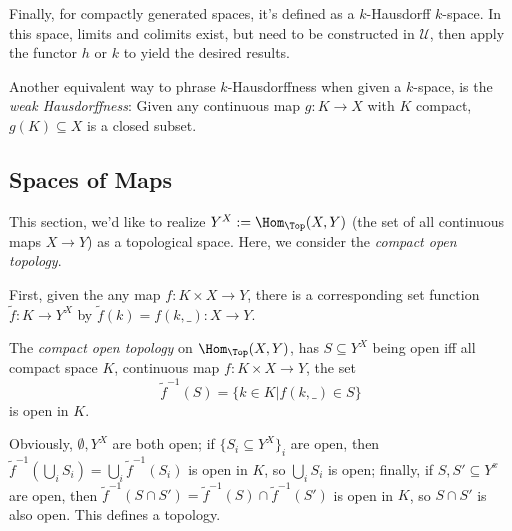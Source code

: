 \documentclass{article}
\begin{document}
Finally, for compactly generated spaces, it's defined as a $k$-Hausdorff $k$-space. In this space, limits and colimits exist, but need to be constructed in $\mathcal{U}$, then apply the functor $h$ or $k$ to yield the desired results.

Another equivalent way to phrase $k$-Hausdorffness when given a $k$-space, is the \emph{weak Hausdorffness}: Given any continuous map $g:K\rightarrow X$ with $K$ compact, $g(K)\subseteq X$ is a closed subset.

\hfil

\subsection{Spaces of Maps}
This section, we'd like to realize $Y^X:=\Hom_\Top(X,Y)$ (the set of all continuous maps $X\rightarrow Y$) as a topological space. Here, we consider the \emph{compact open topology}.

First, given the any map $f:K\times X\rightarrow Y$, there is a corresponding set function $\tilde{f}:K\rightarrow Y^X$ by $\tilde{f}(k) = f(k,\_):X\rightarrow Y$. 
\begin{defn}
    The \emph{compact open topology} on $\Hom_\Top (X,Y)$, has $S\subseteq Y^X$ being open iff all compact space $K$, continuous map $f:K\times X\rightarrow Y$, the set 
    \[\tilde{f}^{-1}(S) = \{k\in K | f(k,\_)\in S\}\]
    is open in $K$.
\end{defn}
Obviously, $\emptyset, Y^X$ are both open; if $\{S_i\subseteq Y^X\}_i$ are open, then $\tilde{f}^{-1}(\bigcup_i S_i)=\bigcup_i \tilde{f}^{-1}(S_i)$ is open in $K$, so $\bigcup_i S_i$ is open; finally, if $S,S'\subseteq Y^x$ are open, then $\tilde{f}^{-1}(S\cap S')=\tilde{f}^{-1}(S)\cap \tilde{f}^{-1}(S')$ is open in $K$, so $S\cap S'$ is also open. This defines a topology.
\end{document}
